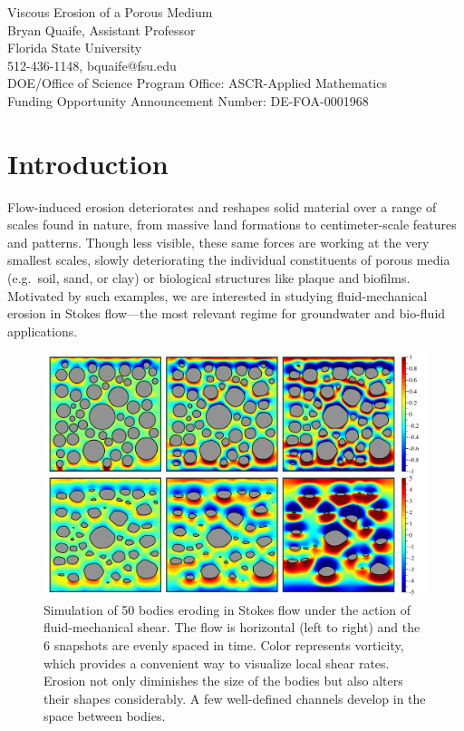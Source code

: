 \documentclass[11pt]{article}
\begin{document}
\begin{center}
Viscous Erosion of a Porous Medium \\
Bryan Quaife, Assistant Professor \\
Florida State University \\
512-436-1148, bquaife@fsu.edu \\
DOE/Office of Science Program Office: ASCR-Applied Mathematics \\
Funding Opportunity Announcement Number: DE-FOA-0001968
\end{center}

\section{Introduction}
Flow-induced erosion deteriorates and reshapes solid material over a
range of scales found in nature, from massive land formations to
centimeter-scale features and patterns. Though less visible, these same
forces are working at the very smallest scales, slowly deteriorating the
individual constituents of porous media (e.g.~soil, sand, or clay) or
biological structures like plaque and biofilms. Motivated by such
examples, we are interested in studying fluid-mechanical erosion in
Stokes flow---the most relevant regime for groundwater and bio-fluid
applications.

\begin{figure}[htp]
\includegraphics[width=\textwidth]{figs/50bod.pdf}
\caption{\label{fig:50bod} Simulation of 50 bodies eroding in Stokes
flow under the action of fluid-mechanical shear. The flow is horizontal
(left to right) and the 6 snapshots are evenly spaced in time. Color
represents vorticity, which provides a convenient way to visualize local
shear rates. Erosion not only diminishes the size of the bodies but also
alters their shapes considerably. A few well-defined channels develop in
the space between bodies.}
\end{figure}
\end{document}
